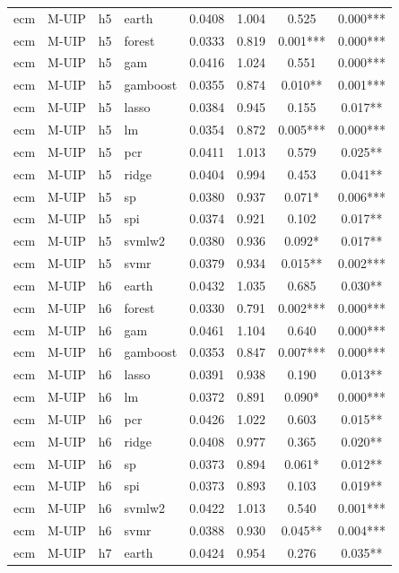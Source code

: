 \begin{ThreePartTable}
\begin{longtable}[t]{llclcccc}
\addlinespace
ecm & M-UIP & h5 & earth & 0.0408 & 1.004 & 0.525 & 0.000***\\
ecm & M-UIP & h5 & forest & 0.0333 & 0.819 & 0.001*** & 0.000***\\
ecm & M-UIP & h5 & gam & 0.0416 & 1.024 & 0.551 & 0.000***\\
ecm & M-UIP & h5 & gamboost & 0.0355 & 0.874 & 0.010** & 0.001***\\
ecm & M-UIP & h5 & lasso & 0.0384 & 0.945 & 0.155 & 0.017**\\
ecm & M-UIP & h5 & lm & 0.0354 & 0.872 & 0.005*** & 0.000***\\
ecm & M-UIP & h5 & pcr & 0.0411 & 1.013 & 0.579 & 0.025**\\
ecm & M-UIP & h5 & ridge & 0.0404 & 0.994 & 0.453 & 0.041**\\
ecm & M-UIP & h5 & sp & 0.0380 & 0.937 & 0.071* & 0.006***\\
ecm & M-UIP & h5 & spi & 0.0374 & 0.921 & 0.102 & 0.017**\\
ecm & M-UIP & h5 & svmlw2 & 0.0380 & 0.936 & 0.092* & 0.017**\\
ecm & M-UIP & h5 & svmr & 0.0379 & 0.934 & 0.015** & 0.002***\\
\addlinespace
ecm & M-UIP & h6 & earth & 0.0432 & 1.035 & 0.685 & 0.030**\\
ecm & M-UIP & h6 & forest & 0.0330 & 0.791 & 0.002*** & 0.000***\\
ecm & M-UIP & h6 & gam & 0.0461 & 1.104 & 0.640 & 0.000***\\
ecm & M-UIP & h6 & gamboost & 0.0353 & 0.847 & 0.007*** & 0.000***\\
ecm & M-UIP & h6 & lasso & 0.0391 & 0.938 & 0.190 & 0.013**\\
ecm & M-UIP & h6 & lm & 0.0372 & 0.891 & 0.090* & 0.000***\\
ecm & M-UIP & h6 & pcr & 0.0426 & 1.022 & 0.603 & 0.015**\\
ecm & M-UIP & h6 & ridge & 0.0408 & 0.977 & 0.365 & 0.020**\\
ecm & M-UIP & h6 & sp & 0.0373 & 0.894 & 0.061* & 0.012**\\
ecm & M-UIP & h6 & spi & 0.0373 & 0.893 & 0.103 & 0.019**\\
ecm & M-UIP & h6 & svmlw2 & 0.0422 & 1.013 & 0.540 & 0.001***\\
ecm & M-UIP & h6 & svmr & 0.0388 & 0.930 & 0.045** & 0.004***\\
\addlinespace
ecm & M-UIP & h7 & earth & 0.0424 & 0.954 & 0.276 & 0.035**\\

\end{longtable}
\end{ThreePartTable}
